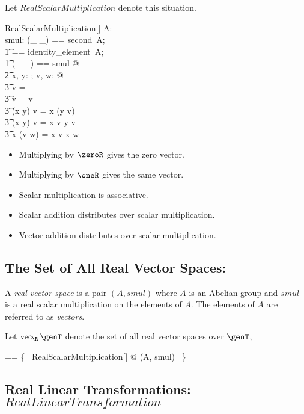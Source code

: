 \documentclass{amsart}
\begin{document}
Let $RealScalarMultiplication$ denote this situation.

\begin{schema}{RealScalarMultiplication}[\genT]
A: \abgroup \genT \\
smul: \R \cross \genT \fun \genT
\where
\LET (\_ \addV \_) == second~A; \\
\t1	\zeroV == identity\_element~A; \\
\t1	(\_ \mulS \_) == smul @ \\
\t2		\forall x, y: \R; v, w: \genT @ \\
\t3			\zeroR \mulS v = \zeroV \land \\
\t3			\oneR \mulS v = v \land \\
\t3			(x \mulR y) \mulS v = x \mulS (y \mulS v) \land \\
\t3			(x \addR y) \mulS v = x \mulS v \addV y \mulS v \land \\
\t3			x \mulS (v \addV w) = x \mulS v \addV x \mulS w
\end{schema}

\begin{itemize}
	\item Multiplying by $\zeroR$ gives the zero vector.
	\item Multiplying by $\oneR$ gives the same vector.
	\item Scalar multiplication is associative.
	\item Scalar addition distributes over scalar multiplication.
	\item Vector addition distributes over scalar multiplication.
\end{itemize}

\subsection{The Set of All Real Vector Spaces: }

A {\em real vector space} is a pair $(A, smul)$ where $A$ is an Abelian group and $smul$
is a real scalar multiplication on the elements of $A$.
The elements of $A$ are referred to as \textit{vectors}.

Let $\vecR \genT$ denote the set of all real vector spaces over $\genT$,

\begin{zed}
\vecR \genT == \{~ RealScalarMultiplication[\genT] @ (A, smul) ~\}
\end{zed}

\subsection{Real Linear Transformations: $RealLinearTransformation$}
\end{document}
